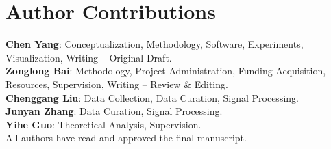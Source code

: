 \documentclass[12pt]{article}
\begin{document}
	
	\section*{Author Contributions}
	
	\textbf{Chen Yang}: Conceptualization, Methodology, Software, Experiments, Visualization, Writing – Original Draft.\\[1.5em]
	\textbf{Zonglong Bai}: Methodology, Project Administration, Funding Acquisition, Resources, Supervision, Writing – Review \& Editing.\\[1.5em]
	\textbf{Chenggang Liu}: Data Collection, Data Curation, Signal Processing.\\[1.5em]
	\textbf{Junyan Zhang}: Data Curation, Signal Processing.\\[1.5em]
	\textbf{Yihe Guo}: Theoretical Analysis, Supervision.\\[1.5em]
	All authors have read and approved the final manuscript.
	
	
\end{document}
